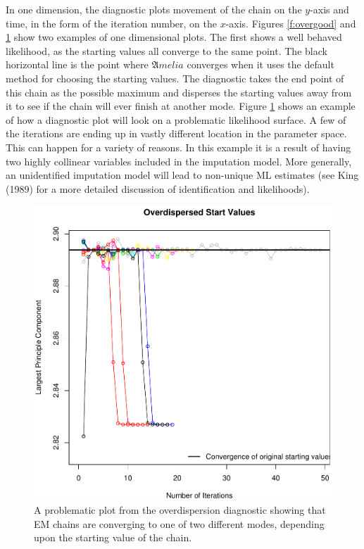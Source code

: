 \documentclass[12pt,titlepage]{article}
\newcommand{\Amelia}{\ensuremath{\mathfrak Amelia} }
\begin{document}
In one dimension, the diagnostic plots movement of the chain on the
$y$-axis and time, in the form of the iteration number, on the
$x$-axis.  Figures \ref{f:overgood} and \ref{f:overbad} show two examples of one dimensional plots.
The first shows a well behaved likelihood, as the starting values all
converge to the same point.  The black horizontal line is the point
where \Amelia converges when it uses the default method for choosing
the starting values.  The diagnostic takes the end point of this chain
as the possible maximum and disperses the starting values away from it
to see if the chain will ever finish at another mode.  Figure \ref{f:overbad} shows
an example of how a diagnostic plot will look on a problematic
likelihood surface.  A few of the iterations are ending up in vastly
different location in the parameter space.  This can happen for a
variety of reasons.  In this example it is a result of having two
highly collinear variables included in the imputation model.  More
generally, an unidentified imputation model will lead to non-unique ML
estimates (see King (1989) for a more detailed discussion of
identification and likelihoods).
\begin{figure}\label{f:overbad}
  \centering \includegraphics[scale=.5]{disperse-bad}
  \caption{ A problematic plot from the overdispersion diagnostic
    showing that EM chains are converging to one of two different
    modes, depending upon the starting value of the chain.}
\end{figure}
\end{document}
